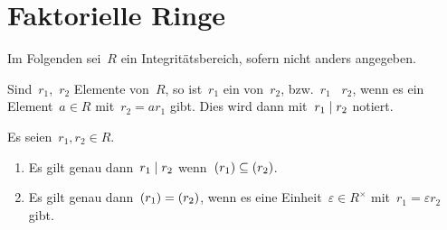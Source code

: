 
%
%





\clearpage





\section{Faktorielle Ringe}

\begin{convention}
  Im Folgenden sei~$R$ ein Integritätsbereich, sofern nicht anders angegeben.
\end{convention}

\begin{definition}
  Sind~$r_1$,~$r_2$ Elemente von~$R$, so ist~$r_1$ ein  von~$r_2$, bzw.~$r_1$ ~$r_2$, wenn es ein Element~$a \in R$ mit~$r_2 = a r_1$ gibt.
  Dies wird dann mit~$r_1 \mid r_2$ notiert.
\end{definition}

\begin{proposition}
  Es seien~$r_1, r_2 \in R$.
  \begin{enumerate}
    \item
      Es gilt genau dann~$r_1 \mid r_2$ wenn~$(r_1) \subseteq (r_2)$.
    \item
      Es gilt genau dann~$(r_1) = (r_2)$, wenn es eine Einheit~$\varepsilon \in R^\times$ mit~$r_1 = \varepsilon r_2$ gibt.
  \end{enumerate}
\end{proposition}

